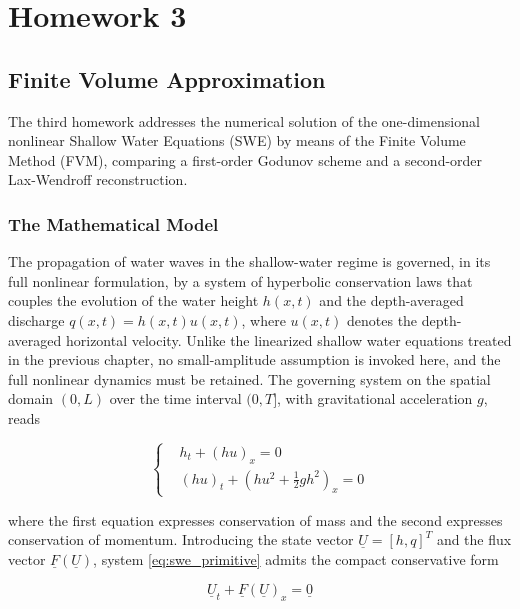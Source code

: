 
\chapter{Homework 3}
\label{sc:H3}

\section{Finite Volume Approximation}
\label{sc:31}

The third homework addresses the numerical solution of the one-dimensional nonlinear Shallow Water Equations (SWE) by means of the Finite Volume Method (FVM), comparing a first-order Godunov scheme and a second-order Lax-Wendroff reconstruction.

\subsection{The Mathematical Model}
\label{ssc:311}

The propagation of water waves in the shallow-water regime is governed, in its full nonlinear formulation, by a system of hyperbolic conservation laws that couples the evolution of the water height \( h(x,t) \) and the depth-averaged discharge \( q(x,t) = h(x,t)u(x,t) \), where \( u(x,t) \) denotes the depth-averaged horizontal velocity. Unlike the linearized shallow water equations treated in the previous chapter, no small-amplitude assumption is invoked here, and the full nonlinear dynamics must be retained. The governing system on the spatial domain \( (0, L) \) over the time interval \( (0, T] \), with gravitational acceleration \( g \), reads

\begin{equation}
\left\{
\begin{aligned}
& h_t + (hu)_x = 0 \\
& (hu)_t + \left(hu^2 + \frac{1}{2}gh^2\right)_{x} = 0
\end{aligned}
\right.
\label{eq:swe_primitive}
\end{equation}

where the first equation expresses conservation of mass and the second expresses conservation of momentum. Introducing the state vector \( \underline{U} = [h, q]^{T} \) and the flux vector \( \underline{F}(\underline{U}) \), system \eqref{eq:swe_primitive} admits the compact conservative form

\begin{equation}
\underline{U}_t + \underline{F}(\underline{U})_x = \underline{0}
\label{eq:swe_conservative}
\end{equation}

